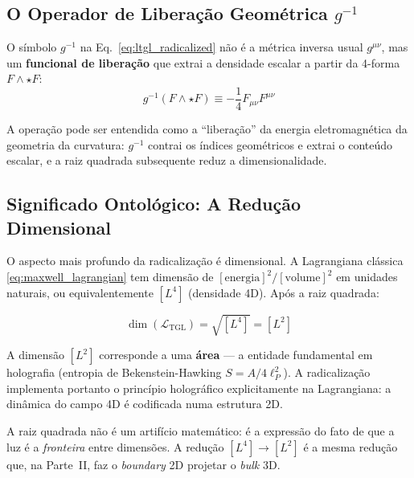 \documentclass[12pt,a4paper,twoside]{article}
\newcommand{\Ltgl}{\mathcal{L}_{\text{TGL}}}
\newcommand{\boundary}{\textit{boundary}}
\newcommand{\bulk}{\textit{bulk}}
\begin{document}
\subsection{O Operador de Libera\c{c}\~ao Geom\'etrica $g^{-1}$}

O s\'imbolo $g^{-1}$ na Eq.~\eqref{eq:ltgl_radicalized} n\~ao \'e a m\'etrica inversa usual $g^{\mu\nu}$, mas um \textbf{funcional de libera\c{c}\~ao} que extrai a densidade escalar a partir da 4-forma $F \wedge \star F$:
\begin{equation}
g^{-1}(F \wedge \star F) \equiv -\frac{1}{4}F_{\mu\nu}F^{\mu\nu}
\label{eq:liberation_operator}
\end{equation}

A opera\c{c}\~ao pode ser entendida como a ``libera\c{c}\~ao'' da energia eletromagn\'etica da geometria da curvatura: $g^{-1}$ contrai os \'indices geom\'etricos e extrai o conte\'udo escalar, e a raiz quadrada subsequente reduz a dimensionalidade.


\subsection{Significado Ontol\'ogico: A Redu\c{c}\~ao Dimensional}

O aspecto mais profundo da radicaliza\c{c}\~ao \'e dimensional. A Lagrangiana cl\'assica \eqref{eq:maxwell_lagrangian} tem dimens\~ao de $[\text{energia}]^2 / [\text{volume}]^2$ em unidades naturais, ou equivalentemente $[L^4]$ (densidade 4D). Ap\'os a raiz quadrada:

\begin{equation}
\dim(\Ltgl) = \sqrt{[L^4]} = [L^2]
\label{eq:dimensional_reduction}
\end{equation}

\noindent A dimens\~ao $[L^2]$ corresponde a uma \textbf{\'area} --- a entidade fundamental em holografia (entropia de Bekenstein-Hawking $S = A/4\ell_P^2$). A radicaliza\c{c}\~ao implementa portanto o princ\'ipio hologr\'afico explicitamente na Lagrangiana: a din\^amica do campo 4D \'e codificada numa estrutura 2D.

\begin{resultbox}[title={Princ\'ipio Hologr\'afico na Lagrangiana}]
A raiz quadrada n\~ao \'e um artif\'icio matem\'atico: \'e a express\~ao do fato de que a luz \'e a \textit{fronteira} entre dimens\~oes. A redu\c{c}\~ao $[L^4] \to [L^2]$ \'e a mesma redu\c{c}\~ao que, na Parte~II, faz o \boundary{} 2D projetar o \bulk{} 3D.
\end{resultbox}
\end{document}
